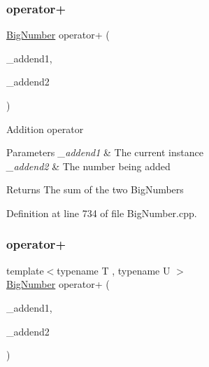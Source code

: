 \subsubsection{\texorpdfstring{operator+}{operator+}\hspace{0.1cm}{\footnotesize\ttfamily [1/2]}}
{\footnotesize\ttfamily \mbox{\hyperlink{class_big_nums_1_1_big_number}{Big\+Number}} operator+ (\begin{DoxyParamCaption}\item[{\mbox{\hyperlink{class_big_nums_1_1_big_number}{Big\+Number}}}]{\+\_\+addend1,  }\item[{const \mbox{\hyperlink{class_big_nums_1_1_big_number}{Big\+Number}} \&}]{\+\_\+addend2 }\end{DoxyParamCaption})\hspace{0.3cm}{\ttfamily [friend]}}

Addition operator 
\begin{DoxyParams}{Parameters}
{\em \+\_\+addend1} & The current instance \\
\hline
{\em \+\_\+addend2} & The number being added \\
\hline
\end{DoxyParams}
\begin{DoxyReturn}{Returns}
The sum of the two Big\+Numbers 
\end{DoxyReturn}


Definition at line 734 of file Big\+Number.\+cpp.

\mbox{\label{class_big_nums_1_1_big_number_ab90a430bf6202a4f133fc915101cd929}} 
\subsubsection{\texorpdfstring{operator+}{operator+}\hspace{0.1cm}{\footnotesize\ttfamily [2/2]}}
{\footnotesize\ttfamily template$<$typename T , typename U $>$ \\
\mbox{\hyperlink{class_big_nums_1_1_big_number}{Big\+Number}} operator+ (\begin{DoxyParamCaption}\item[{const T \&}]{\+\_\+addend1,  }\item[{const U \&}]{\+\_\+addend2 }\end{DoxyParamCaption})\hspace{0.3cm}{\ttfamily [friend]}}



